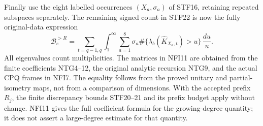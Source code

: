 Finally use the eight labelled occurrences $(X_a,\sigma_a)$ of
STF16, retaining repeated subspaces separately. The remaining
signed count in STF22 is now the fully original-data expression
\[
 \mathcal B_e^{>R}
  =\sum_{t=q-1,q}\int_1^\infty
       \sum_{a=1}^8\sigma_a
       \#\{\lambda_b(\widehat K_{X_a,t})>u\}
       \,\frac{du}{u}.
                                                               \tag{NFI11}
\]
All eigenvalues count multiplicities. The matrices in NFI11 are
obtained from the finite coefficients NTG4--12, the original
analytic recursion NTG9, and the actual CPQ frames in NFI7.
The equality follows from the proved unitary and partial-isometry
maps, not from a comparison of dimensions. With the accepted prefix
$R_j$, the finite discrepancy bounds STF20--21 and its prefix
budget apply without change. NFI11 gives the full coefficient
formula for the growing-degree quantity; it does not assert a
large-degree estimate for that quantity.
\endgroup
